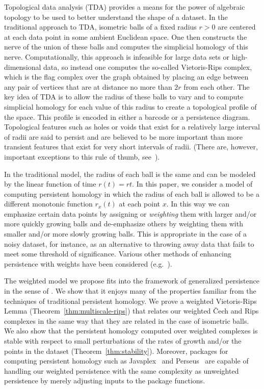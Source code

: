 \documentclass{amsart}
\newtheorem*{fibering lemma}{Fibering Lemma}
\newtheorem*{decomposition lemma}{Decomposition Lemma}
\newtheorem*{hurewicz theorem}{Hurewicz Theorem}
\theoremstyle{definition}
\begin{document}
Topological data analysis (TDA) provides a means for the power of algebraic topology to be used to better understand the shape of a dataset. In the traditional approach to TDA, isometric balls of a fixed radius $r>0$ are centered at each data point in some ambient Euclidean space. One then constructs the nerve of the union of these balls and computes the simplicial homology of this nerve. Computationally, this approach is infeasible for large data sets or high-dimensional data, so instead one computes the so-called Vietoris-Rips complex, which is the flag complex over the graph obtained by placing an edge between any pair of vertices that are at distance no more than $2r$ from each other. The key idea of TDA is to allow the radius of these balls to vary and to compute simplicial homology for each value of this radius to create a topological profile of the space. This profile is encoded in either a barcode or a persistence diagram. Topological features such as holes or voids that exist for a relatively large interval of radii are said to persist and are believed to be more important than more transient features that exist for very short intervals of radii. (There are, however, important exceptions to this rule of thumb, see~\cite{Brains}).

In the traditional model, the radius of each ball is the same and can be modeled by the linear function of time $r(t) = r t$.  In this paper, we consider a model of computing persistent homology in which the radius of each ball is allowed to be a different monotonic function $r_x(t)$ at each point $x$.  In this way we can emphasize certain data points by assigning or {\em weighting} them with larger and/or more quickly growing balls and de-emphasize others by weighting them with smaller and/or more slowly growing balls. This is appropriate in the case of a noisy dataset, for instance, as an alternative to throwing away data that fails to meet some threshold of significance. Various other methods of enhancing persistence with weights have been considered (e.g.~\cite{Buchet,Edelsbrunner,Petri,Ren-Further,Ren}).

The weighted model we propose fits into the framework of generalized persistence in the sense of \cite{BdSS}. We show that it enjoys many of the properties familiar from the techniques of traditional persistent homology. We prove a weighted Vietoris-Rips Lemma (Theorem~\ref{thm:multiscale-rips}) that relates our weighted \v{C}ech and Rips complexes in the same way that they are related in the case of isometric balls. We also show that the persistent homology computed over weighted complexes is stable with respect to small perturbations of the rates of growth and/or the points in the dataset (Theorem~\ref{thm:stability}). Moreover, packages for computing persistent homology such as Javaplex~\cite{Javaplex} and Perseus~\cite{Perseus} are capable of handling our weighted persistence with the same complexity as unweighted persistence by merely adjusting inputs to the package functions.
\end{document}

